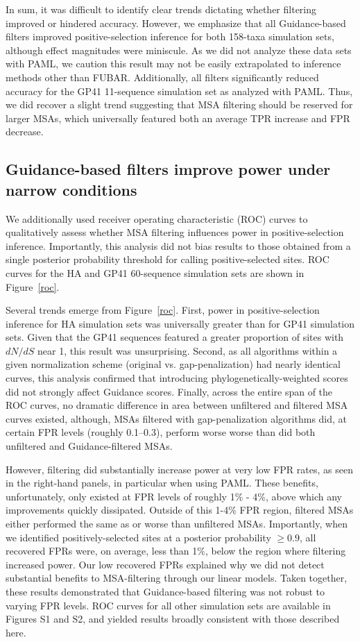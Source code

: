 \documentclass[11pt]{article}
\begin{document}
In sum, it was difficult to identify clear trends dictating whether filtering improved or hindered accuracy. However, we emphasize that all Guidance-based filters improved positive-selection inference for both 158-taxa simulation sets, although effect magnitudes were miniscule. As we did not analyze these data sets with PAML, we caution this result may not be easily extrapolated to inference methods other than FUBAR. Additionally, all filters significantly reduced accuracy for the GP41 11-sequence simulation set as analyzed with PAML. Thus, we did recover a slight trend suggesting that MSA filtering should be reserved for larger MSAs, which universally featured both an average TPR increase and FPR decrease.

\subsection*{Guidance-based filters improve power under narrow conditions}

We additionally used receiver operating characteristic (ROC) curves to qualitatively assess whether MSA filtering influences power in positive-selection inference. Importantly, this analysis did not bias results to those obtained from a single posterior probability threshold for calling positive-selected sites. ROC curves for the HA and GP41 60-sequence simulation sets are shown in Figure~\ref{roc}. 

Several trends emerge from Figure~\ref{roc}. First, power in positive-selection inference for HA simulation sets was universally greater than for GP41 simulation sets. Given that the GP41 sequences featured a greater proportion of sites with $dN/dS$ near 1, this result was unsurprising. Second, as all algorithms within a given normalization scheme (original vs. gap-penalization) had nearly identical curves, this analysis confirmed that introducing phylogenetically-weighted scores did not strongly affect Guidance scores. Finally, across the entire span of the ROC curves, no dramatic difference in area between unfiltered and filtered MSA curves existed, although, MSAs filtered with gap-penalization algorithms did, at certain FPR levels (roughly 0.1--0.3), perform worse worse than did both unfiltered and Guidance-filtered MSAs. 

However, filtering did substantially increase power at very low FPR rates, as seen in the right-hand panels, in particular when using PAML. These benefits, unfortunately, only existed at FPR levels of roughly 1\% - 4\%, above which any improvements quickly dissipated. Outside of this 1-4\% FPR region, filtered MSAs either performed the same as or worse than unfiltered MSAs.
Importantly, when we identified positively-selected sites at a posterior probability $\geq 0.9$, all recovered FPRs were, on average, less than 1\%, below the region where filtering increased power. Our low recovered FPRs explained why we did not detect substantial benefits to MSA-filtering through our linear models. Taken together, these results demonstrated that Guidance-based filtering was not robust to varying FPR levels. ROC curves for all other simulation sets are available in Figures S1 and S2, and yielded results broadly consistent with those described here.
\end{document}
